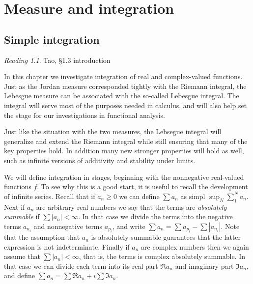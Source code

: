 \documentclass[11pt,oneside]{amsbook}
\theoremstyle{definition}
\theoremstyle{plain}
\theoremstyle{definition}
\theoremstyle{remark}
\newtheorem*{reading}{Reading}
\numberwithin{equation}{section}
\numberwithin{figure}{section}
\begin{document}
\chapter{Measure and integration}

\section{Simple integration}

\begin{reading}
  Tao, \S 1.3 introduction
\end{reading}

In this chapter we investigate integration of real and complex-valued functions. Just as the Jordan measure corresponded tightly with the Riemann integral, the Lebesgue measure can be associated with the so-called Lebesgue integral. The integral will serve most of the purposes needed in calculus, and will also help set the stage for our investigations in functional analysis.

Just like the situation with the two measures, the Lebsegue integral will generalize and extend the Riemann integral while still ensuring that many of the key properties hold. In addition many new stronger properties will hold as well, such as infinite versions of additivity and stability under limits.


We will define integration in stages, beginning with the nonnegative real-valued functions $f$. To see why this is a good start, it is useful to recall the development of infinite series. Recall that if $a_n\geq0$ we can define $\sum a_n$ as simpl $\sup_N\sum_1^Na_n$. Next if $a_n$ are arbitrary real numbers we say that the terms are \emph{absolutely summable} if $\sum|a_n|<\infty$. In that case we divide the terms into the negative terms $a_{n_i}$ and nonnegative terms $a_{p_i}$, and write $\sum a_n=\sum a_{p_i}-\sum|a_{n_i}|$. Note that the assumption that $a_n$ is absolutely summable guarantees that the latter expression is not indeterminate. Finally if $a_n$ are complex numbers then we again assume that $\sum|a_n|<\infty$, that is, the terms is complex absolutely summable. In that case we can divide each term into its real part $\Re a_n$ and imaginary part $\Im a_n$, and define $\sum a_n=\sum\Re a_n+i\sum\Im a_n$.
\end{document}
